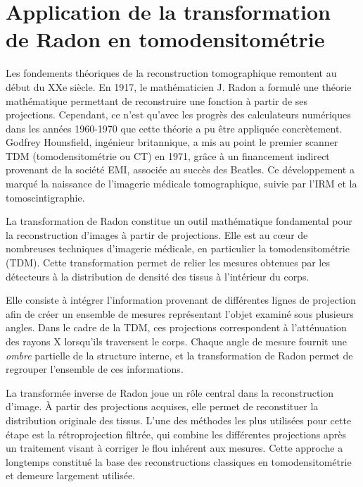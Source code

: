 \section{Application de la transformation de Radon en tomodensitométrie}
Les fondements théoriques de la reconstruction tomographique remontent au début du XXe siècle. En 1917, le mathématicien J. Radon a formulé une théorie mathématique permettant de reconstruire une fonction à partir de ses projections.
Cependant, ce n'est qu'avec les progrès des calculateurs numériques dans les années 1960-1970 que cette théorie a pu être appliquée concrètement. Godfrey Hounsfield, ingénieur britannique, a mis au point le premier scanner TDM (tomodensitométrie ou CT) en 1971, grâce à un financement indirect provenant de la société EMI, associée au succès des Beatles. Ce développement a marqué la naissance de l'imagerie médicale tomographique, suivie par l'IRM et la tomoscintigraphie.

La transformation de Radon constitue un outil mathématique fondamental pour la reconstruction d'images à partir de projections. Elle est au cœur de nombreuses techniques d'imagerie médicale, en particulier la tomodensitométrie (TDM). Cette transformation permet de relier les mesures obtenues par les détecteurs à la distribution de densité des tissus à l'intérieur du corps.

Elle consiste à intégrer l'information provenant de différentes lignes de projection afin de créer un ensemble de mesures représentant l'objet examiné sous plusieurs angles. Dans le cadre de la TDM, ces projections correspondent à l'atténuation des rayons X lorsqu'ils traversent le corps. Chaque angle de mesure fournit une \textit{ombre} partielle de la structure interne, et la transformation de Radon permet de regrouper l'ensemble de ces informations.

La transformée inverse de Radon joue un rôle central dans la reconstruction d'image. À partir des projections acquises, elle permet de reconstituer la distribution originale des tissus. L'une des méthodes les plus utilisées pour cette étape est la rétroprojection filtrée, qui combine les différentes projections après un traitement visant à corriger le flou inhérent aux mesures. Cette approche a longtemps constitué la base des reconstructions classiques en tomodensitométrie et demeure largement utilisée.


